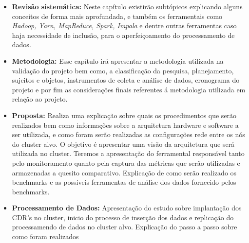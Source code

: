     \begin{itemize}
        \item \textbf{Revisão sistemática:} Neste capítulo existirão subtópicos explicando alguns conceitos de forma mais
                                                                    aprofundada, e também os ferramentais como \textit{Hadoop, Yarn, MapReduce, Spark,
                                                                    Impala} e dentre outras ferramentas caso haja necessidade de inclusão, para o
                                                                    aperfeiçoamento do processamento de dados.
        \item \textbf{Metodologia:} Esse capítulo irá apresentar a metodologia utilizada na validação do projeto bem como,
                                                       a classificação da pesquisa, planejamento, sujeitos e objetos, instrumentos de coleta e
                                                       análise de dados, cronograma do projeto e por fim as considerações finais referentes á
                                                       metodologia utilizada em relação ao projeto.
        \item \textbf{Proposta: } Realiza uma explicação sobre quais os procedimentos que serão realizados bem como
                                                  informações sobre a arquitetura hardware e software a ser utilizada, e como foram serão
                                                  realizadas as configurações rede entre os nós do cluster alvo. O objetivo é apresentar uma visão da
                                                  arquitetura que será utilizada no cluster. Teremos a apresentação do ferramental responsável
                                                  tanto pelo monitoramento quanto pela captura das métricas que serão utilizadas e armazenadas
                                                  a quesito comparativo. Explicação de como serão realizado os benchmarks e as possíveis
                                                  ferramentas de análise dos dados fornecido pelos benchmarks.
        \item \textbf{Processamento de Dados:} Apresentação do estudo sobre implantação dos CDR's no cluster, inicio do
                                                                            processo de inserção dos dados e replicação do processamendo de dados
                                                                            no cluster alvo. Explicação do passo a passo sobre como foram realizados

\end{itemize}
